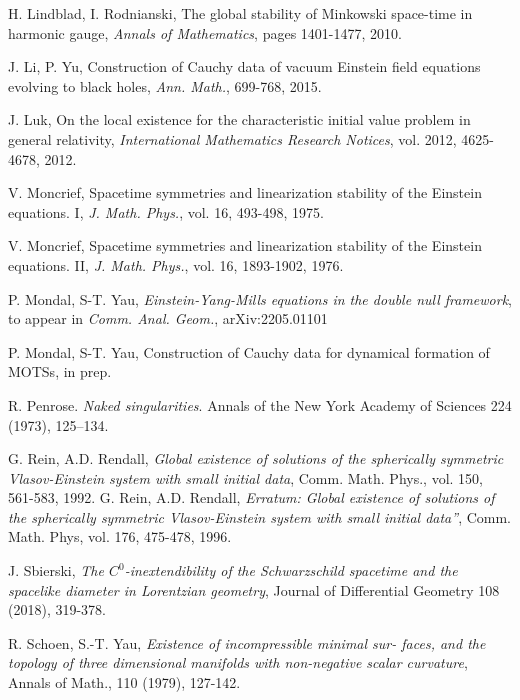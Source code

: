 \documentclass{amsart}
\begin{document}
{\begin{thebibliography}{}
 H. Lindblad, I. Rodnianski, The global stability of Minkowski space-time in harmonic gauge, \textit{Annals of Mathematics}, pages 1401-1477, 2010.


 J. Li, P. Yu, Construction of Cauchy data of vacuum Einstein field equations evolving to black holes, \textit{Ann. Math.}, 699-768, 2015. 



 J. Luk, On the local existence for the characteristic initial value problem in general relativity, \textit{International Mathematics Research Notices}, vol. 2012, 4625-4678, 2012.



 V. Moncrief, Spacetime symmetries and linearization stability of the Einstein equations. I, \textit{J. Math. Phys.}, vol. 16, 493-498, 1975.

 V. Moncrief, Spacetime symmetries and linearization stability of the Einstein equations. II, \textit{J. Math. Phys.}, vol. 16, 1893-1902, 1976.




 P. Mondal, S-T. Yau, \textit{Einstein-Yang-Mills equations in the double null framework}, to appear in \textit{Comm. Anal. Geom.}, arXiv:2205.01101


 P. Mondal, S-T. Yau, Construction of Cauchy data for dynamical formation of MOTSs, in prep. 


 R. Penrose. \textit{Naked singularities}. Annals of the  New York Academy of Sciences 224 (1973), 125–134.





 G. Rein, A.D. Rendall, \textit{Global existence of solutions of the spherically symmetric Vlasov-Einstein system with small initial data}, Comm. Math. Phys., vol. 150, 561-583, 1992.  
G. Rein, A.D. Rendall, \textit{Erratum: 
Global existence of solutions of the spherically symmetric Vlasov-Einstein system with small initial data''}, Comm. Math. Phys, vol. 176, 475-478, 1996.

 J. Sbierski, \textit{The $C^0$-inextendibility of the Schwarzschild spacetime and the spacelike diameter in Lorentzian geometry}, Journal of Differential Geometry 108 (2018), 319-378.

 R. Schoen, S.-T. Yau, \textit{ Existence of incompressible minimal sur-
faces, and the topology of three dimensional manifolds with non-negative scalar curvature}, Annals of Math., 110 (1979), 127-142.


\end{thebibliography}}
\end{document}
